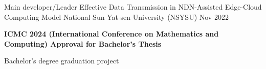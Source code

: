 

\begin{cventries}

    \cventry
    {Main developer/Leader}
    {Effective Data Transmission in NDN-Assisted Edge-Cloud Computing Model}
    {National Sun Yat-sen University (NSYSU)} %
    {Nov 2022} %
    {
        \begin{cvitems} %
            \item {\textbf{ICMC 2024 (International Conference on Mathematics and Computing) Approval for Bachelor's Thesis}}
            \item {Bachelor's degree graduation project}
        \end{cvitems}
    }

    
\end{cventries}
